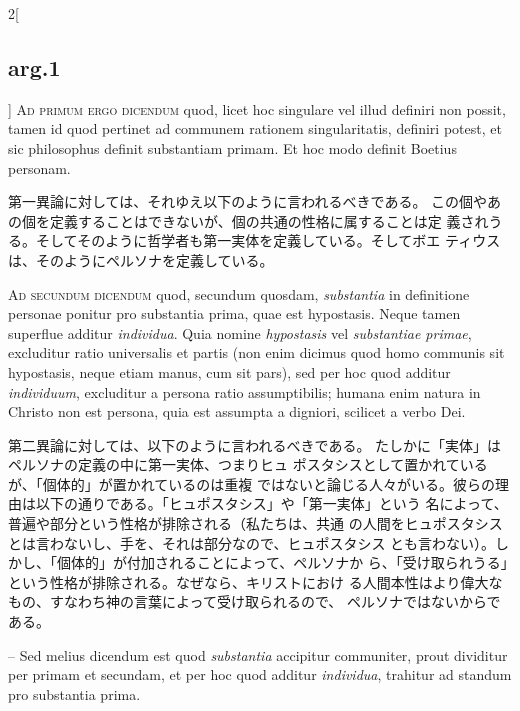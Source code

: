 \documentclass[paper=a4paper,fontsize=10pt,jafontsize=9pt,titlepage]{jlreq}
\begin{document}
\begin{paracol}{2}[\subsection{arg.1}]
{\scshape Ad primum ergo dicendum} quod, licet hoc singulare vel illud definiri non
possit, tamen id quod pertinet ad communem rationem singularitatis,
definiri potest, et sic philosophus definit substantiam primam. Et hoc
modo definit Boetius personam.

\switchcolumn

第一異論に対しては、それゆえ以下のように言われるべきである。
この個やあの個を定義することはできないが、個の共通の性格に属することは定
 義されうる。そしてそのように哲学者も第一実体を定義している。そしてボエ
 ティウスは、そのようにペルソナを定義している。

\switchcolumn*[\subsection{ad.2}]

{\scshape Ad secundum dicendum} quod, secundum quosdam, {\itshape substantia} in definitione
personae ponitur pro substantia prima, quae est hypostasis. Neque tamen
superflue additur {\itshape individua}. Quia nomine {\itshape hypostasis} vel {\itshape substantiae
primae}, excluditur ratio universalis et partis (non enim dicimus quod
homo communis sit hypostasis, neque etiam manus, cum sit pars), sed per
hoc quod additur {\itshape individuum}, excluditur a persona ratio assumptibilis;
humana enim natura in Christo non est persona, quia est assumpta a
digniori, scilicet a verbo Dei.

\switchcolumn

第二異論に対しては、以下のように言われるべきである。
たしかに「実体」はペルソナの定義の中に第一実体、つまりヒュ
 ポスタシスとして置かれているが、「個体的」が置かれているのは重複
 ではないと論じる人々がいる。彼らの理由は以下の通りである。「ヒュポスタシス」や「第一実体」という
 名によって、普遍や部分という性格が排除される（私たちは、共通
 の人間をヒュポスタシスとは言わないし、手を、それは部分なので、ヒュポスタシス
 とも言わない）。しかし、「個体的」が付加されることによって、ペルソナか
 ら、「受け取られうる」という性格が排除される。なぜなら、キリストにおけ
 る人間本性はより偉大なもの、すなわち神の言葉によって受け取られるので、
 ペルソナではないからである。

\switchcolumn*

-- Sed melius dicendum est quod {\itshape substantia}
accipitur communiter, prout dividitur per primam et secundam, et per hoc
quod additur {\itshape individua}, trahitur ad standum pro substantia prima.

\switchcolumn


\end{paracol}
\end{document}
